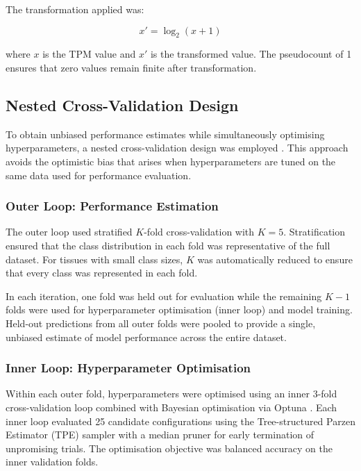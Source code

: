 The transformation applied was:

\begin{equation}
    x' = \log_2(x + 1)
    \label{eq:log_transform}
\end{equation}

where $x$ is the TPM value and $x' $ is the transformed value. The pseudocount of 1 ensures that zero values remain finite after transformation.

\subsection{Nested Cross-Validation Design}\label{sec:methods:nested_cv}

To obtain unbiased performance estimates while simultaneously optimising hyperparameters, a nested cross-validation design was employed \parencite{varma_bias_2006}. This approach avoids the optimistic bias that arises when hyperparameters are tuned on the same data used for performance evaluation.

\subsubsection{Outer Loop: Performance Estimation}

The outer loop used stratified $K$-fold cross-validation with $K = 5$. Stratification ensured that the class distribution in each fold was representative of the full dataset. For tissues with small class sizes, $K$ was automatically reduced to ensure that every class was represented in each fold.

In each iteration, one fold was held out for evaluation while the remaining $K - 1$ folds were used for hyperparameter optimisation (inner loop) and model training. Held-out predictions from all outer folds were pooled to provide a single, unbiased estimate of model performance across the entire dataset.

\subsubsection{Inner Loop: Hyperparameter Optimisation}

Within each outer fold, hyperparameters were optimised using an inner 3-fold cross-validation loop combined with Bayesian optimisation via Optuna \parencite{akiba_optuna_2019}. Each inner loop evaluated 25 candidate configurations using the Tree-structured Parzen Estimator (TPE) sampler \parencite{bergstra_algorithms_2011} with a median pruner for early termination of unpromising trials. The optimisation objective was balanced accuracy on the inner validation folds.

